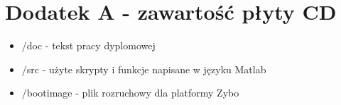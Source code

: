 \chapter{Dodatek A - zawartość płyty CD}
\begin{itemize}
\item /doc - tekst pracy dyplomowej
\item /src - użyte skrypty i funkcje napisane w języku Matlab
\item /bootimage - plik rozruchowy dla platformy Zybo
\end{itemize}








